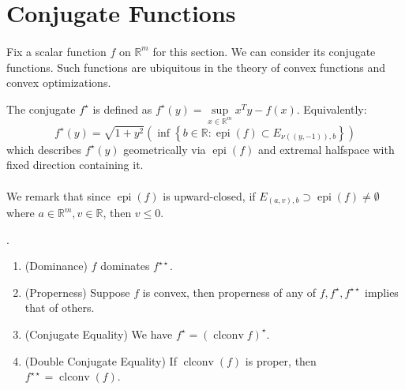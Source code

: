\section{Conjugate Functions}
\label{sect:025}

\paragraph{}Fix a scalar function $f$ on $\mathbb{R}^m$ for this section. We can consider its conjugate functions. Such functions are ubiquitous in the theory of convex functions and convex optimizations.

\begin{defn}[Conjugate]\label{defn:025-conjugate}
	The conjugate $f^\star$ is defined as $f^\star(y)=\underset{x\in \mathbb{R}^m}{\operatorname{sup}}x^Ty-f(x)$. Equivalently:
	\[
		f^\star(y) =\sqrt{1+y^2}\left(\inf\left\{b\in \mathbb{R}:\operatorname{epi}(f)\subset E_{\nu((y,-1)),b}\right\}\right)
	\]
	which describes $f^\star(y)$ geometrically via $\operatorname{epi}(f)$ and extremal halfspace with fixed direction containing it.
\end{defn}

\paragraph{}We remark that since $\operatorname{epi}(f)$ is upward-closed, if $E_{(a,v),b}\supset \operatorname{epi}(f)\neq\emptyset$ where $a\in \mathbb{R}^{m},v\in \mathbb{R}$, then $v\leq 0$.


\begin{prop}\label{prop:025-conjugacy-theorem}.
	\begin{enumerate}[label=(\alph*)]
		\item (Dominance) $f$ dominates $f^{\star\star}$.
		\item (Properness) Suppose $f$ is convex, then properness of any of $f,f^{\star},f^{\star\star}$ implies that of others.
		\item (Conjugate Equality) We have $f^\star=(\operatorname{clconv}f)^\star$.
		\item (Double Conjugate Equality) If $\operatorname{clconv}(f)$ is proper, then $f^{\star\star}=\operatorname{clconv}(f)$.
	\end{enumerate}
\end{prop}

